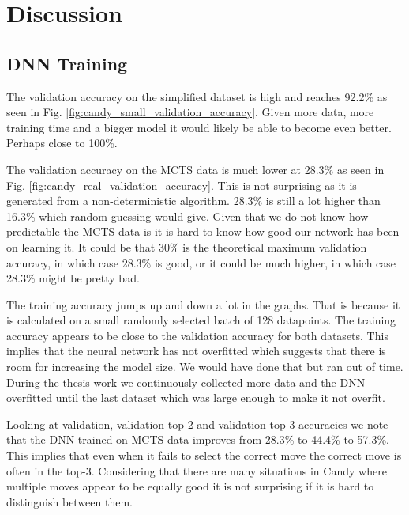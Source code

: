 \documentclass{kththesis}
\begin{document}
\chapter{Discussion}
\section{DNN Training}
The validation accuracy on the simplified dataset is high and reaches 92.2\% as seen in Fig. \ref{fig:candy_small_validation_accuracy}. Given more data, more training time and a bigger model  it would likely be able to become even better. Perhaps close to 100\%.

The validation accuracy on the MCTS data is much lower at 28.3\% as seen in Fig. \ref{fig:candy_real_validation_accuracy}. This is not surprising as  it is generated from a non-deterministic algorithm. 28.3\% is still a lot higher than 16.3\% which random guessing would give. Given that we do not know how predictable the MCTS data is it is hard to know how good our network has been on learning it. It could be that 30\% is the theoretical maximum validation accuracy, in which case 28.3\% is good, or it could be much higher, in which case 28.3\% might be pretty bad. 

The training accuracy jumps up and down a lot in the  graphs. That is because  it is calculated on a small randomly selected batch  of 128 datapoints. The training accuracy appears to be close to the validation accuracy for both datasets. This  implies that the neural network has not overfitted which suggests that there is room for increasing the model size. We would have done that but ran out of time.  During the thesis work we continuously collected  more data and the DNN overfitted until the last dataset which was  large enough to make it not overfit. 

Looking at validation, validation top-2 and validation top-3 accuracies we note that the DNN trained on MCTS data improves from 28.3\% to 44.4\% to 57.3\%. This implies that even when it fails to select the correct move the correct move is often in the top-3. Considering that there are many situations in Candy where multiple moves appear to be equally good it is not surprising if it is hard to distinguish between them. 
\end{document}
